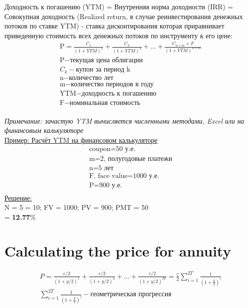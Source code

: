 \documentclass{article}
\begin{document}
Доходность к погашению (YTM) = Внутренняя норма доходности (IRR) = Совокупная доходность (Realized return, в случае реинвестирования денежных потоков по ставке YTM) - ставка дисконтирования которая приравнивает приведенную стоимость всех денежных потоков по инструменту к его цене:
\begin{align*}
    & \text{P} = \frac{C_{1}}{(1 + YTM)^{1}} + \frac{C_{2}}{(1 + YTM)^{2}} + ... + \frac{C_{n\times m} + F}{(1 + YTM)^{n\times m}}\\
     & \text{P} - \text{текущая цена облигации}\\
    & C_{k} - \text{купон за период k}\\
    & \text{n} - \text{количество лет}\\
    & \text{m} - \text{количество периодов в году}\\
    & \text{YTM} - \text{доходность к погашению}\\
    & \text{F} - \text{номинальная стоимость}\\
\end{align*}

\textit{Примечание: зачастую YTM вычисляется численными методами, Excel или на финансовым калькуляторе}
\\
\underline{Пример: Расчёт YTM на финансовом калькуляторе}
\begin{align*}
    & \text{coupon} = \text{50 у.е.}\\
    & \text{m} = \text{2, полугодовые платежи}\\
    & \text{n} = \text{5 лет}\\
    & \text{F, face value} = \text{1000 у.е.}\\
    & \text{P} = \text{900 у.е.}\\
\end{align*}
\underline{Решение:}\\
N = 5 = 10; FV = 1000; PV = 900; PMT = 50\\
   = \textbf{12.77}\%\\
 \section{Calculating the price for annuity}
 
\begin{align*}
    & P = \frac{c/2}{(1 + y/2)^{1}} + \frac{c/2}{(1 + y/2)^{2}} + ... + \frac{c/2}{(1 + y/2)^{2T}} = \frac{c}{2}\sum_{i=1}^{2T} \frac{1}{(1 + \frac{y}{2})^{i}}\\
    & \sum_{i=1}^{2T} \frac{1}{(1 + \frac{y}{2})^{i}} - \text{геометрическая прогрессия}
\end{align*}
\end{document}
